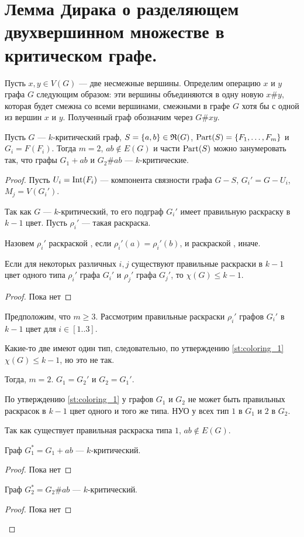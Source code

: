 \section{Лемма Дирака о разделяющем двухвершинном множестве в критическом графе.}
\begin{definition}
    Пусть $x, y \in V(G)$ --- две несмежные вершины. Определим операцию  $x$ и $y$ графа $G$ следующим образом: эти вершины объединяются в одну новую $x\#y$, которая будет смежна со всеми вершинами, смежными в графе $G$ хотя бы с одной из вершин $x$ и $y$. Полученный граф обозначим через $G\#xy$.
\end{definition}
\begin{lemma}[Дирак, 1953]\label{lm:coloring_9}
    Пусть $G$ --- $k$-критический граф, $S = \{a, b\} \in \mathfrak{R}(G)$, $\operatorname{Part}(S) = \{F_1, \ldots , F_m\}$ и $G_i = F(F_i)$. Тогда $m = 2$, $ab \notin E(G)$ и части $\operatorname{Part}(S)$ можно занумеровать так, что графы $G_1 + ab$ и $G_2 \# ab$ --- $k$-критические.
\end{lemma}
\begin{proof}
    Пусть $U_i = \operatorname{Int}(F_i)$ ---  компонента связности графа $G - S$, $G_i' = G - U_i$, $M_j = V(G_i')$.

	Так как $G$ --- $k$-критический, то его подграф $G_i'$ имеет правильную раскраску в $k-1$ цвет. Пусть $\rho_i'$ --- такая раскраска.

	Назовем $\rho_i'$ раскраской , если $\rho_i'(a) = \rho_i'(b)$, и раскраской , иначе.
	\begin{statement} \label{st:coloring_1}
	    Если для некоторых различных $i, j$ существуют правильные раскраски в $k-1$ цвет одного типа $\rho_i'$ графа $G_i'$ и $\rho_j'$ графа $G_j'$, то $\chi(G) \le k-1$.
	\end{statement}
	\begin{proof}
	    Пока нет
	\end{proof}
	Предположим, что $m \ge 3$. Рассмотрим правильные раскраски $\rho_i'$ графов $G_i'$ в $k-1$ цвет для $i \in [1..3]$.

	Какие-то две имеют один тип, следовательно, по утверждению \ref{st:coloring_1} $\chi(G) \le k-1$, но это не так.

	Тогда, $m = 2$. $G_1 = G_2'$ и $G_2 = G_1'$.

	По утверждению \ref{st:coloring_1} у графов $G_1$ и $G_2$ не может быть правильных раскрасок в $k-1$ цвет одного и того же типа. НУО у всех тип $1$ в $G_1$ и $2$ в $G_2$.

	Так как существует правильная раскраска типа $1$, $ab \notin E(G)$.
	\begin{statement}\label{st:coloring_2}
		Граф $G_1^* = G_1 + ab$ --- $k$-критический.
	\end{statement}
	\begin{proof}
	    Пока нет
	\end{proof}
	\begin{statement}\label{st:coloring_3}
	    Граф $G_2^* = G_2 \# ab$ --- $k$-критический.
	\end{statement}
	\begin{proof}
	    Пока нет
	\end{proof}
\end{proof}
